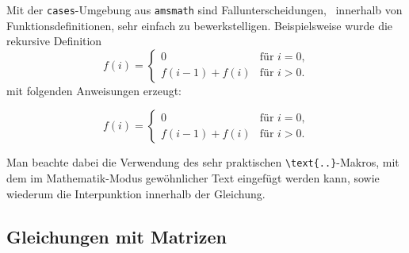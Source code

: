 Mit der \texttt{cases}-Umgebung aus \texttt{amsmath} sind Fallunterscheidungen, \ua\ innerhalb von Funktionsdefinitionen, sehr einfach zu bewerkstelligen. Beispielsweise wurde die rekursive Definition
%
\begin{equation}
	f(i) =
	\begin{cases}
	  0             & \text{für $i = 0$,}\\
	  f(i-1) + f(i) & \text{für $i > 0$.}
	\end{cases}
\end{equation}
mit folgenden Anweisungen erzeugt:
%
\begin{LaTeXCode}[numbers=none]
\begin{equation}
	f(i) =
	\begin{cases}
	  0             & \text{für $i = 0$,}\\
	  f(i-1) + f(i) & \text{für $i > 0$.}
	\end{cases}
\end{equation}
\end{LaTeXCode}
%
Man beachte dabei die Verwendung des sehr praktischen \verb!\text{..}!-Makros, mit dem im Mathematik-Modus gewöhnlicher Text eingefügt werden kann, sowie wiederum die Interpunktion innerhalb der Gleichung.


\subsection{Gleichungen mit Matrizen}

